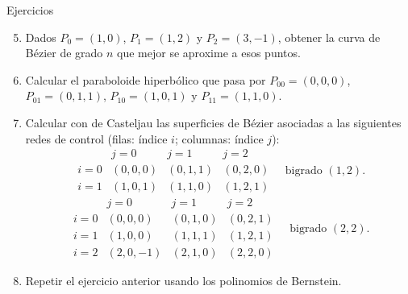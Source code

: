 \documentclass[original_version/main.tex]{subfiles}
\begin{document}
\begin{frame}[t]{Ejercicios}
\scriptsize\begin{enumerate}\setcounter{enumi}{4}\item Dados $P_0=(1,0)$, $P_1=(1,2)$ y $P_2=(3,-1)$, obtener la curva de Bézier de grado $n$ que mejor se aproxime a esos puntos.\item Calcular el paraboloide hiperbólico que pasa por $P_{00}=(0,0,0)$, $P_{01}=(0,1,1)$, $P_{10}=(1,0,1)$ y $P_{11}=(1,1,0)$.\item Calcular con de Casteljau las superficies de Bézier asociadas a las siguientes redes de control (filas: índice $i$; columnas: índice $j$):\[\begin{array}{c|ccc} &j=0&j=1&j=2\\\hline i=0&(0,0,0)&(0,1,1)&(0,2,0)\\i=1&(1,0,1)&(1,1,0)&(1,2,1)\end{array}\quad\text{bigrado }(1,2).\]\[\begin{array}{c|ccc} &j=0&j=1&j=2\\\hline i=0&(0,0,0)&(0,1,0)&(0,2,1)\\i=1&(1,0,0)&(1,1,1)&(1,2,1)\\i=2&(2,0,-1)&(2,1,0)&(2,2,0)\end{array}\quad\text{bigrado }(2,2).\]\item Repetir el ejercicio anterior usando los polinomios de Bernstein.\end{enumerate}
\end{frame}
\end{document}
